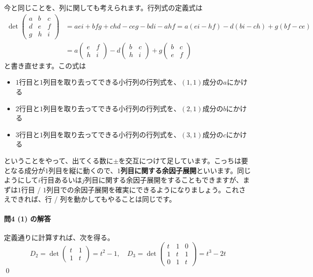 今と同じことを、列に関しても考えられます。行列式の定義式は
\begin{align*}
\det
\begin{pmatrix}
a & b & c \\
d & e & f \\
g & h & i
\end{pmatrix}
&=  aei + bfg + chd - ceg - bdi - ahf
= a(ei - hf) - d(bi - ch) + g(bf - ce) \\
&=
a
\begin{pmatrix}
e & f \\
h & i
\end{pmatrix}
- d
\begin{pmatrix}
b & c \\
h & i
\end{pmatrix}
+ g
\begin{pmatrix}
b & c \\
e & f
\end{pmatrix}
\end{align*}
と書き直せます。この式は
\begin{itemize}
\item \uline{$1$}行目と\uline{$1$}列目を取り去ってできる小行列の行列式を、\uline{$(1, 1)$}成分の$a$にかける
\item \uline{$2$}行目と\uline{$1$}列目を取り去ってできる小行列の行列式を、\uline{$(2, 1)$}成分の$b$にかける
\item \uline{$3$}行目と\uline{$1$}列目を取り去ってできる小行列の行列式を、\uline{$(3, 1)$}成分の$c$にかける
\end{itemize}
ということをやって、出てくる数に$\pm$を交互につけて足しています。こっちは要となる成分が$1$列目を縦に動くので、\textbf{$1$列目に関する余因子展開}といいます。同じようにして$i$行目あるいは$j$列目に関する余因子展開をすることもできますが、まずは$1$行目 / $1$列目での余因子展開を確実にできるようになりましょう。これさえできれば、行 / 列を動かしてもやることは同じです。

\paragraph{問4 (1) の解答} 定義通りに計算すれば、次を得る。
\[
D_2 = \det
\begin{pmatrix}
t & 1 \\
1 & t
\end{pmatrix}
= t^2 - 1, \quad
D_3 = \det
\begin{pmatrix}
t & 1 & 0 \\
1 & t & 1 \\
0 & 1 & t
\end{pmatrix}
= t^3 - 2t
\]
\qed


